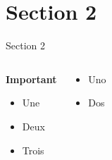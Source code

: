 \documentclass[usenames,dvipsnames, 8pt]{beamer}
\begin{document}
\section{Section 2} %
\begin{frame}{Section 2} %
\begin{columns}[T] %
    \begin{alertblock}{\textbf{Important}}
    \begin{itemize}
        \item Une
        \item Deux
        \item Trois
    \end{itemize}
    \end{alertblock}
\begin{example}
    \begin{itemize}
        \item Uno
        \item Dos
    \end{itemize}
\end{example}
\end{columns}
\end{frame}
\end{document}
